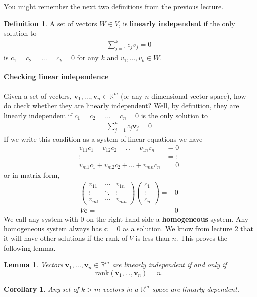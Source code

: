 \documentclass[12pt,reqno]{amsart}
\def\R{\mathbb{R}}
\newcommand{\gmatrix}[1]{\begin{pmatrix} {#1}_{11} & \cdots &
    {#1}_{1n} \\ \vdots & \ddots & \vdots \\ {#1}_{m1} & \cdots &
    {#1}_{mn} \end{pmatrix}}
\newcommand{\rank}{\mathrm{rank}}
\newtheorem{corollary}{Corollary}[section]
\newtheorem{lemma}{Lemma}[section]
\theoremstyle{definition}
\newtheorem{definition}{Definition}[section]
\begin{document}
You might remember the next two definitions from the previous lecture.
\begin{definition}
  A set of vectors $W \in V$, is \textbf{linearly
    independent} if the only solution to
  \begin{align*}
    \sum_{j=1}^k c_j v_j = 0 
  \end{align*}
  is $c_1 = c_2 = ... = c_k = 0$ for any $k$ and $v_1, ..., v_k \in W$.
\end{definition}

\paragraph{Checking linear independence}
Given a set of vectors, $\mathbf{v}_1, ..., \mathbf{v}_n \in \R^m$ (or
any $n$-dimensional vector space), how do check whether they are
linearly independent? Well, by definition, they are linearly
independent if $c_1 = c_2 = ... = c_n = 0$ is the only solution to
\begin{align*}
  \sum_{j=1}^n c_j \mathbf{v}_j = 0 
\end{align*}
If we write this condition as a system of linear equations we have
\begin{align*}
  v_{11} c_1 + v_{12} c_2 + ... + v_{1n} c_n & = 0 \\
  \vdots & = \vdots \\
  v_{m1} c_1 + v_{m2} c_2 + ... + v_{mn} c_n & = 0 
\end{align*}
or in matrix form,
\begin{align*}
  \gmatrix{v} \begin{pmatrix} c_1 \\ \vdots \\ c_n \end{pmatrix} = &
  0 \\
  V \mathbf{c} = & 0 
\end{align*}
We call any system with $0$ on the right hand side a
\textbf{homogeneous} system. Any homogeneous system always has
$\mathbf{c}=0$ as a solution. We know from lecture 2 that it will have
other solutions if the rank of $V$ is less than $n$. This proves the
following lemma.
\begin{lemma}\label{lem:rankli}
  Vectors $\mathbf{v}_1, ..., \mathbf{v}_n \in \R^m$ are linearly
  independent if and only if
  \[ \rank(\mathbf{v}_1, ..., \mathbf{v}_n) = n. \]
\end{lemma}
\begin{corollary}\label{cor:kmli}
  Any set of $k>m$ vectors in a $\R^m$ space are linearly dependent.
\end{corollary}
\end{document}

